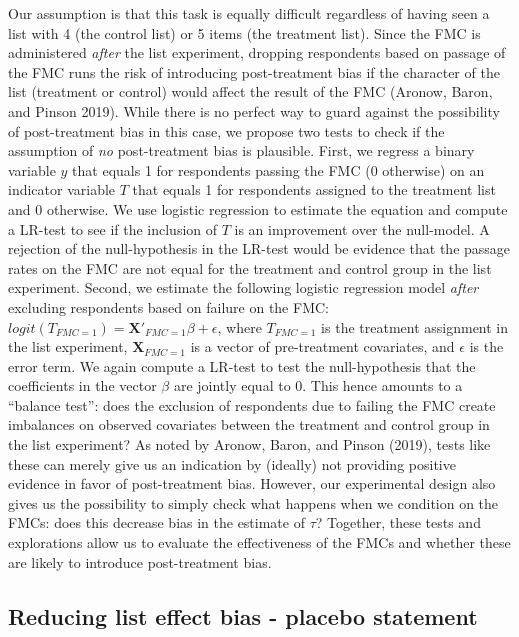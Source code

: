 \documentclass[]{article}
\begin{document}
Our assumption is that this task is equally difficult regardless of
having seen a list with 4 (the control list) or 5 items (the treatment
list). Since the FMC is administered \emph{after} the list experiment,
dropping respondents based on passage of the FMC runs the risk of
introducing post-treatment bias if the character of the list (treatment
or control) would affect the result of the FMC (Aronow, Baron, and
Pinson 2019). While there is no perfect way to guard against the
possibility of post-treatment bias in this case, we propose two tests to
check if the assumption of \emph{no} post-treatment bias is plausible.
First, we regress a binary variable \(y\) that equals 1 for respondents
passing the FMC (0 otherwise) on an indicator variable \(T\) that equals
1 for respondents assigned to the treatment list and 0 otherwise. We use
logistic regression to estimate the equation and compute a LR-test to
see if the inclusion of \(T\) is an improvement over the null-model. A
rejection of the null-hypothesis in the LR-test would be evidence that
the passage rates on the FMC are not equal for the treatment and control
group in the list experiment. Second, we estimate the following logistic
regression model \emph{after} excluding respondents based on failure on
the FMC: \(logit(T_{FMC = 1}) = \mathbf{X'}_{FMC = 1}\beta + \epsilon\),
where \(T_{FMC = 1}\) is the treatment assignment in the list
experiment, \(\mathbf{X}_{FMC = 1}\) is a vector of pre-treatment
covariates, and \(\epsilon\) is the error term. We again compute a
LR-test to test the null-hypothesis that the coefficients in the vector
\(\beta\) are jointly equal to 0. This hence amounts to a ``balance
test'': does the exclusion of respondents due to failing the FMC create
imbalances on observed covariates between the treatment and control
group in the list experiment? As noted by Aronow, Baron, and Pinson
(2019), tests like these can merely give us an indication by (ideally)
not providing positive evidence in favor of post-treatment bias.
However, our experimental design also gives us the possibility to simply
check what happens when we condition on the FMCs: does this decrease
bias in the estimate of \(\tau\)? Together, these tests and explorations
allow us to evaluate the effectiveness of the FMCs and whether these are
likely to introduce post-treatment bias.

\hypertarget{reducing-list-effect-bias---placebo-statement}{%
\subsection{Reducing list effect bias - placebo
statement}\label{reducing-list-effect-bias---placebo-statement}}
\end{document}
